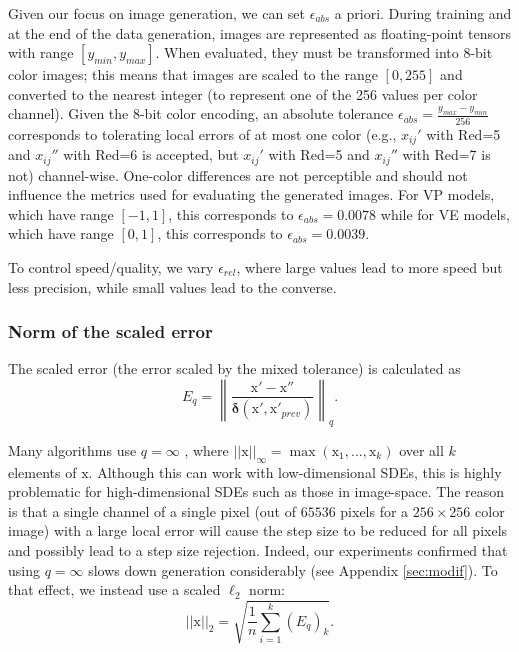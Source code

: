 \documentclass{article}
\newcommand{\norm}[1]{\left\lVert#1\right\rVert}
\newcommand{\bdelta}{\boldsymbol{\delta}}
\newcommand{\x}{\boldsymbol{\mathrm{x}}}
\begin{document}
Given our focus on image generation, we can set $\epsilon_{abs}$ a priori. During training and at the end of the data generation, images are represented as floating-point tensors with range $[y_{min},y_{max}]$. When evaluated, they must be transformed into 8-bit color images; this means that images are scaled to the range $[0,255]$ and converted to the nearest integer (to represent one of the 256 values per color channel). Given the 8-bit color encoding, an absolute tolerance $\epsilon_{abs} = \frac{y_{max}-y_{min}}{256}$ corresponds to tolerating local errors of at most one color (e.g., $x_{ij}'$ with Red=5 and $x_{ij}''$ with Red=6 is accepted, but $x_{ij}'$ with Red=5 and $x_{ij}''$ with Red=7 is not) channel-wise. One-color differences are not perceptible and should 
not influence the metrics used for evaluating the generated images.
For VP models, which have range $[-1,1]$, this corresponds to $\epsilon_{abs} = 0.0078$ while for VE models, which have range $[0,1]$, this corresponds to $\epsilon_{abs} = 0.0039$.

To control speed/quality, we vary $\epsilon_{rel}$, where large values lead to more speed but less precision, while small values lead to the converse.

\subsubsection{Norm of the scaled error}

The scaled error (the error scaled by the mixed tolerance) is calculated as \begin{equation*} 
E_{q} = \norm{\frac{\x' - \x''}{\bdelta(\x', \x'_{prev})}}_q.
\end{equation*}

Many algorithms use $q=\infty$ \citep{lamba2003adaptive, rackauckas2017adaptive}, where $||\x||_{\infty} = \max(\x_1, ... , \x_k)$ over all $k$ elements of $\x$. Although this can work with low-dimensional SDEs, this is highly problematic for high-dimensional SDEs such as those in image-space. The reason is that a single channel of a single pixel (out of $65536$ pixels for a $256\times256$ color image) with a large local error will cause the step size to be reduced for all pixels and possibly lead to a step size rejection. Indeed, our experiments confirmed that using $q=\infty$ slows down generation considerably (see Appendix \ref{sec:modif}). To that effect, we instead use a scaled $\ell_2$ norm: 
\begin{equation*} ||\x||_{2} = \sqrt{\frac{1}{n} \sum_{i=1}^k (E_{q})_k}.\end{equation*}
\end{document}
